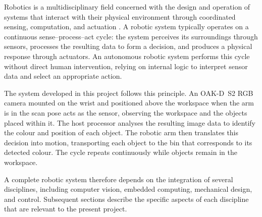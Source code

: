 \label{sec:robotics}
Robotics is a multidisciplinary field concerned with the design 
and operation of systems that interact with their physical 
environment through coordinated sensing, computation, and 
actuation \cite{craig2005}. A robotic system typically operates 
on a continuous sense--process--act cycle: the system perceives 
its surroundings through sensors, processes the resulting data to 
form a decision, and produces a physical response through 
actuators. An autonomous robotic system performs this cycle 
without direct human intervention, relying on internal logic 
to interpret sensor data and select an appropriate action.

The system developed in this project follows this principle. An 
OAK-D~S2 RGB camera mounted on the wrist and positioned above the 
workspace when the arm is in the scan pose acts as the sensor, 
observing the workspace and the objects placed within it. The host 
processor analyses the resulting image data to identify the colour 
and position of each object. The robotic arm then translates this 
decision into motion, transporting each object to the bin that 
corresponds to its detected colour. The cycle repeats continuously 
while objects remain in the workspace.

A complete robotic system therefore depends on the integration of 
several disciplines, including computer vision, embedded computing, 
mechanical design, and control. Subsequent sections describe the 
specific aspects of each discipline that are relevant to the 
present project.
